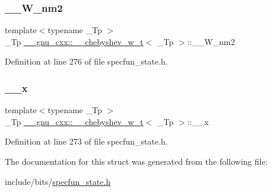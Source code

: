 \subsubsection{\texorpdfstring{\+\_\+\+\_\+\+W\+\_\+nm2}{\_\_W\_nm2}}
{\footnotesize\ttfamily template$<$typename \+\_\+\+Tp $>$ \\
\+\_\+\+Tp \hyperlink{struct____gnu__cxx_1_1____chebyshev__w__t}{\+\_\+\+\_\+gnu\+\_\+cxx\+::\+\_\+\+\_\+chebyshev\+\_\+w\+\_\+t}$<$ \+\_\+\+Tp $>$\+::\+\_\+\+\_\+\+W\+\_\+nm2}



Definition at line 276 of file specfun\+\_\+state.\+h.

\mbox{\label{struct____gnu__cxx_1_1____chebyshev__w__t_a812c1414d20763ecd27f95c244a727eb}} 
\subsubsection{\texorpdfstring{\+\_\+\+\_\+x}{\_\_x}}
{\footnotesize\ttfamily template$<$typename \+\_\+\+Tp $>$ \\
\+\_\+\+Tp \hyperlink{struct____gnu__cxx_1_1____chebyshev__w__t}{\+\_\+\+\_\+gnu\+\_\+cxx\+::\+\_\+\+\_\+chebyshev\+\_\+w\+\_\+t}$<$ \+\_\+\+Tp $>$\+::\+\_\+\+\_\+x}



Definition at line 273 of file specfun\+\_\+state.\+h.



The documentation for this struct was generated from the following file\+:\begin{DoxyCompactItemize}
\item 
include/bits/\hyperlink{specfun__state_8h}{specfun\+\_\+state.\+h}\end{DoxyCompactItemize}

